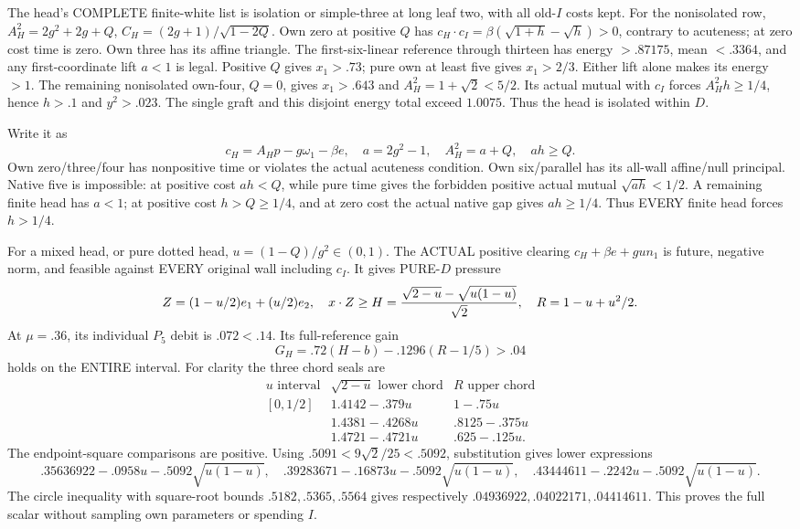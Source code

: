 \documentclass[11pt]{article}
\begin{document}
The head's COMPLETE finite-white list
is isolation or simple-three at long
leaf two, with all old-\(I\) costs kept.
For the nonisolated row,
\(A_H^2=2g^2+2g+Q\),
\(C_H=(2g+1)/\sqrt{1-2Q}\).
Own zero at positive \(Q\) has
\(c_H\cdot c_I=\beta(\sqrt{1+h}-\sqrt h)>0\),
contrary to acuteness; at zero cost
time is zero.
Own three has its affine triangle.
The first-six-linear reference through
thirteen has energy \(>.87175\),
mean \(<.3364\), and any first-coordinate
lift \(a<1\) is legal.
Positive \(Q\) gives \(x_1>.73\);
pure own at least five gives
\(x_1>2/3\).
Either lift alone makes its energy \(>1\).
The remaining nonisolated own-four,
\(Q=0\), gives \(x_1>.643\) and
\(A_H^2=1+\sqrt2<5/2\).
Its actual mutual with \(c_I\) forces
\(A_H^2h\ge1/4\), hence \(h>.1\)
and \(y^2>.023\).
The single graft and this disjoint
energy total exceed \(1.0075\).
Thus the head is isolated within \(D\).

Write it as
\[
 c_H=A_Hp-g\omega_1-\beta e,\quad
 a=2g^2-1,\quad A_H^2=a+Q,\quad ah\ge Q .
\]
Own zero/three/four has nonpositive
time or violates the actual acuteness
condition.
Own six/parallel has its all-wall
affine/null principal.
Native five is impossible: at positive
cost \(ah<Q\), while pure time gives
the forbidden positive actual mutual
\(\sqrt{ah}<1/2\).
A remaining finite head has \(a<1\);
at positive cost \(h>Q\ge1/4\),
and at zero cost the actual native
gap gives \(ah\ge1/4\).
Thus EVERY finite head forces \(h>1/4\).

For a mixed head, or pure dotted head,
\(u=(1-Q)/g^2\in(0,1)\).
The ACTUAL positive clearing
\(c_H+\beta e+gu n_1\) is future,
negative norm, and feasible against
EVERY original wall including \(c_I\).
It gives PURE-\(D\) pressure
\[
 Z=(1-u/2)e_1+(u/2)e_2,\quad
 x\cdot Z\ge H={\sqrt{2-u}-\sqrt{u(1-u)}\over\sqrt2},
 \quad R=1-u+u^2/2 .
\]
At \(\mu=.36\), its individual
\(P_5\) debit is \(.072<.14\).
Its full-reference gain
\[
                     G_H=.72(H-b)-.1296(R-1/5)>.04
\tag{D16IH}\label{eq:arithD16Iheadgain}
\]
holds on the ENTIRE interval.
For clarity the three chord seals are
\[
\begin{array}{c|c|c}
 u\text{ interval}&\sqrt{2-u}\text{ lower chord}&R\text{ upper chord}\\ \hline
 [0,1/2]&1.4142-.379u&1-.75u\\
 [1/2,3/4]&1.4381-.4268u&.8125-.375u\\
 [3/4,1]&1.4721-.4721u&.625-.125u .
\end{array}
\]
The endpoint-square comparisons are positive.
Using \(.5091<9\sqrt2/25<.5092\),
substitution gives lower expressions
\[
 .35636922-.0958u-.5092\sqrt{u(1-u)},\quad
 .39283671-.16873u-.5092\sqrt{u(1-u)},\quad
 .43444611-.2242u-.5092\sqrt{u(1-u)} .
\]
The circle inequality with square-root
bounds \(.5182,.5365,.5564\)
gives respectively
\(.04936922,.04022171,.04414611\).
This proves the full scalar without
sampling own parameters or spending \(I\).
\end{document}
